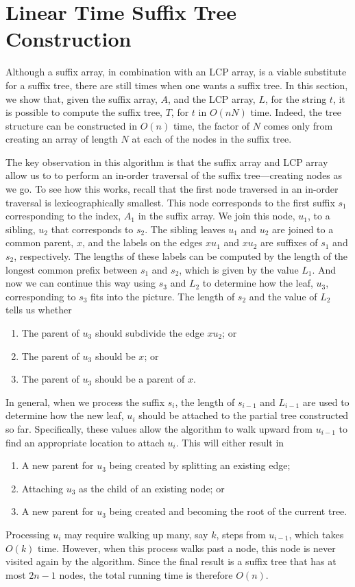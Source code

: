 \section{Linear Time Suffix Tree Construction}

Although a suffix array, in combination with an LCP array, is a viable substitute for a suffix tree, there are still times when one wants a suffix tree.  In this section, we show that, given the suffix array, $A$, and the LCP array, $L$, for the string $t$, it is possible to compute the suffix tree, $T$, for $t$ in $O(nN)$ time.  Indeed, the tree structure can be constructed in $O(n)$ time, the factor of $N$ comes only from creating an array of length $N$ at each of the nodes in the suffix tree.

The key observation in this algorithm is that the suffix array and LCP array allow us to to perform an in-order traversal of the suffix tree---creating nodes as we go.  To see how this works, recall that the first node traversed in an in-order traversal is lexicographically smallest.  This node corresponds to the first suffix $s_1$ corresponding to the index, $A_1$ in the suffix array.  We join this node, $u_1$, to a sibling, $u_2$ that corresponds to $s_2$.  The sibling leaves $u_1$ and $u_2$ are joined to a common parent, $x$, and the labels on the edges $xu_1$ and $xu_2$ are suffixes of $s_1$ and $s_2$, respectively.  The lengths of these labels can be computed by the length of the longest common prefix between $s_1$ and $s_2$, which is given by the value $L_1$.  And now we can continue this way using $s_3$ and $L_2$ to determine how the leaf, $u_3$, corresponding to $s_3$ fits into the picture.  The length of $s_2$ and the value of $L_2$ tells us whether 
\begin{enumerate}
  \item The parent of $u_3$ should subdivide the edge $xu_2$; or
  \item The parent of $u_3$ should be $x$; or
  \item The parent of $u_3$ should be a parent of $x$.
\end{enumerate}
In general, when we process the suffix $s_i$, the length of $s_{i-1}$ and $L_{i-1}$ are used to determine how the new leaf, $u_i$ should be attached to the partial tree constructed so far.  Specifically, these values allow the algorithm to walk upward from $u_{i-1}$ to find an appropriate location to attach $u_i$.  This will either result in 
\begin{enumerate}
  \item A new parent for $u_3$ being created by splitting an existing edge;
  \item Attaching $u_3$ as the child of an existing node; or
  \item A new parent for $u_3$ being created and becoming the root of the current tree.
\end{enumerate}
Processing $u_i$ may require walking up many, say $k$, steps from $u_{i-1}$, 
which takes $O(k)$ time. However, when this process walks past a node, this node is never visited again by the algorithm. Since the final result is a suffix tree that has at most $2n-1$ nodes, the total running time is therefore $O(n)$.

